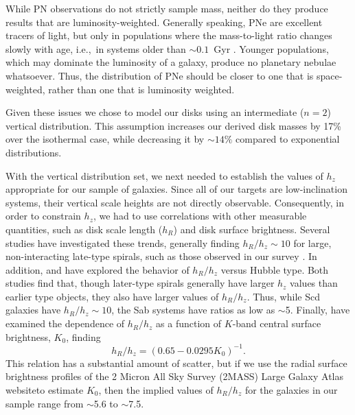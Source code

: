 \documentclass[12pt,preprint]{emulateapj}
\newcommand{\eg}{{e.g.,}}
\newcommand{\ie}{{i.e.,}}
\begin{document}
While PN observations do not strictly sample mass, neither do they produce results that are luminosity-weighted.  Generally speaking, PNe are excellent tracers of light, but only in populations where the mass-to-light ratio changes slowly with age, \ie\ in systems older than $\sim 0.1$~Gyr \citep{maraston}.  Younger populations, which may dominate the luminosity of a galaxy, produce no planetary nebulae whatsoever.  Thus, the distribution of PNe should be closer to one that is space-weighted, rather than one that is luminosity weighted.

Given these issues we chose to model our disks using an intermediate ($n=2$) vertical distribution.  This assumption increases our derived disk masses by 17\% over the isothermal case, while decreasing it by $\sim 14\%$ compared to exponential distributions.

With the vertical distribution set, we next needed to establish the values of $h_z$ appropriate for our sample of galaxies.  Since all of our targets are low-inclination systems, their vertical scale heights are not directly observable.  Consequently, in order to constrain $h_z$, we had to use correlations with other measurable quantities, such as disk scale length ($h_R$) and disk surface brightness.  Several studies have investigated these trends, generally finding $h_R/h_z \sim 10$ for large, non-interacting late-type spirals, such as those observed in our survey \citep[\eg][]{dGvdK96, kvd02, yd06}.  In addition, \citet{dG98} and \citet{kvd02} have explored the behavior of $h_R/h_z$ versus Hubble type.  Both studies find that, though later-type spirals generally have larger $h_z$ values than earlier type objects, they also have larger values of $h_R/h_z$.  Thus, while Scd galaxies have $h_R/h_z \sim 10$, the Sab systems have ratios as low as $\sim$5.  Finally, \citet{bm02} have examined the dependence of $h_R/h_z$ as a function of $K$-band central surface brightness, $K_0$, finding
\begin{equation}
h_R/h_z = \left( 0.65 - 0.0295 K_0 \right)^{-1}.
\label{2MASSEq}
\end{equation}
This relation has a substantial amount of scatter, but if we use the radial surface brightness profiles of the 2 Micron All Sky Survey (2MASS) Large Galaxy Atlas website\footnotemark[4] to estimate $K_0$, then the implied values of $h_R/h_z$ for the galaxies in our sample range from $\sim$5.6 to $\sim$7.5.

\end{document}
